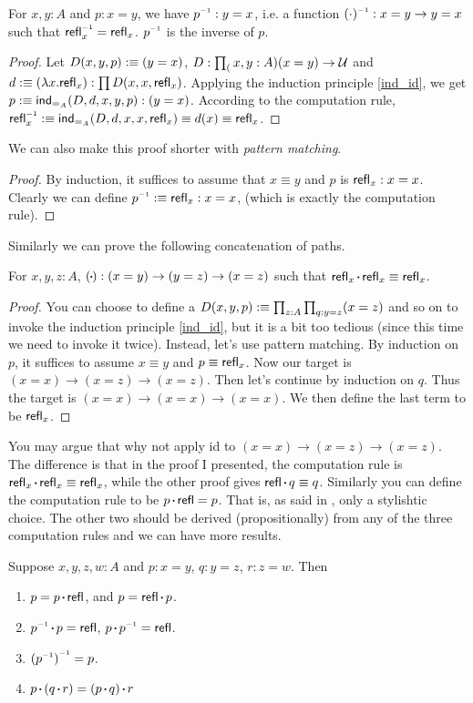 \begin{lemma}
    For $x,y:A$ and $p: x=y$, we have $p\inv: y=x$, i.e.
    a function $(\cdot)\inv: x=y\to y=x$ such that $\refl_x\inv=
    \refl_x$. $p\inv$ is the inverse of $p$.
\end{lemma}
\begin{proof}
    Let $D(x,y,p):\equiv(y=x)$, $D:\prod_(x,y:A)(x=y)\to\mathcal{U}$ and
    $d:\equiv(\lambda x.\text{\sf refl}_x):\prod D(x,x,\text{\sf refl}_x)$. Applying the
    induction principle \eqref{ind_id}, we get 
    $p:\equiv\text{\sf ind}_{=_A}(D,d,x,y,p):(y=x)$. According to the computation
    rule, $\refl_x\inv\defn \ind_{=_A}(D,d,x,x,\refl_x)\equiv d(x)\equiv
    \refl_x$.
\end{proof}
We can also make this proof shorter with {\it pattern matching}.
\begin{proof}
    By induction, it suffices to assume that $x\equiv y$ and $p$ is
    $\text{\sf refl}_x:x=x$. Clearly we can define $p\inv\defn \refl_x:x=x$, (which
    is exactly the computation rule).
\end{proof}

\newcommand{\sqcdot}{\mathbin{\vcenter{\hbox{\rule{.3ex}{.3ex}}}}}
\newcommand{\concat}{\sqcdot}
Similarly we can prove the following concatenation of paths.  
\begin{lemma}
    For $x,y,z: A$, $(\concat):(x=y)\to(y=z)\to(x=z)$ such that
    $\refl_x\concat \refl_x\equiv\refl_x$. 
\end{lemma}
\begin{proof}
    You can choose to define a $D(x,y,p):\equiv\prod_{z:A}\prod_{q:y=z}(x=z)$
    and so on to invoke the induction principle \eqref{ind_id}, but it is
    a bit too tedious (since this time we need to invoke it twice).
    Instead, let's use pattern matching. By induction on $p$, it suffices 
    to assume $x\equiv y$ and $p\equiv\text{\sf refl}_x$. Now our target is
    $(x=x)\to(x=z)\to(x=z)$. Then let's continue by induction on $q$.
    Thus the target is $(x=x)\to(x=x)\to(x=x)$. We then define the last
    term to be $\text{\sf refl}_x$. 
\end{proof}
You may argue that why not apply id to $(x=x)\to(x=z)\to(x=z)$. The 
difference is that in the proof I presented, the computation rule is 
$\refl_x\concat\refl_x\equiv\refl_x$, while the other proof gives 
$\refl\concat q\equiv q$. Similarly you can define the computation
rule to be $p\concat\refl=p$. That is, as said in 
\cite{homotopy-type-theory}, only a stylishtic choice. The other two
should be derived (propositionally) from any of the three computation 
rules and we can have more results.
\begin{lemma}
    Suppose $x,y,z,w:A$ and $p:x=y$, $q:y=z$, $r:z=w$. Then
    \begin{enumerate}
        \item $p=p\concat\refl$, and $p=\refl\concat p$.
        \item $p\inv\concat p=\refl$, $p\concat p\inv=\refl$.
        \item ${(p\inv)}\inv=p$.
        \item $p\concat(q\concat r) = (p\concat q)\concat r$
    \end{enumerate}
\end{lemma}

